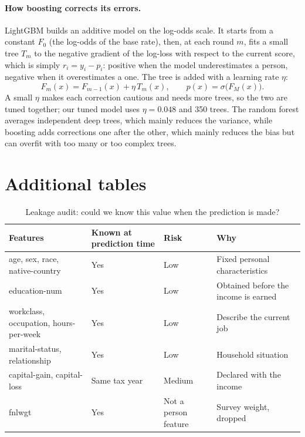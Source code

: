 \paragraph{How boosting corrects its errors.} LightGBM builds an additive model
on the log-odds scale. It starts from a constant $F_0$ (the log-odds of the
base rate), then, at each round $m$, fits a small tree $T_m$ to the negative
gradient of the log-loss with respect to the current score, which is simply
$r_i = y_i - p_i$: positive when the model underestimates a \pos{} person,
negative when it overestimates a \negc{} one. The tree is added with a learning
rate $\eta$:
\[
  F_m(x) = F_{m-1}(x) + \eta\, T_m(x), \qquad
  p(x) = \sigma\bigl(F_M(x)\bigr).
\]
A small $\eta$ makes each correction cautious and needs more trees, so the two
are tuned together; our tuned model uses $\eta = 0.048$ and 350 trees. The
random forest averages independent deep trees, which mainly reduces the
variance, while boosting adds corrections one after the other, which mainly
reduces the bias but can overfit with too many or too complex trees.

\section{Additional tables}

\begin{table}[H]
\centering
\caption{Leakage audit: could we know this value when the prediction is made?}
\label{tab:leakage}
\small
\begin{tabular}{p{4.6cm}p{2.4cm}p{2.2cm}p{5.2cm}}
\toprule
Features & Known at prediction time & Risk & Why \\
\midrule
age, sex, race, native-country & Yes & Low & Fixed personal characteristics \\
education-num & Yes & Low & Obtained before the income is earned \\
workclass, occupation, hours-per-week & Yes & Low & Describe the current job \\
marital-status, relationship & Yes & Low & Household situation \\
capital-gain, capital-loss & Same tax year & Medium & Declared with the income \\
fnlwgt & Yes & Not a person feature & Survey weight, dropped \\
\bottomrule
\end{tabular}
\end{table}

